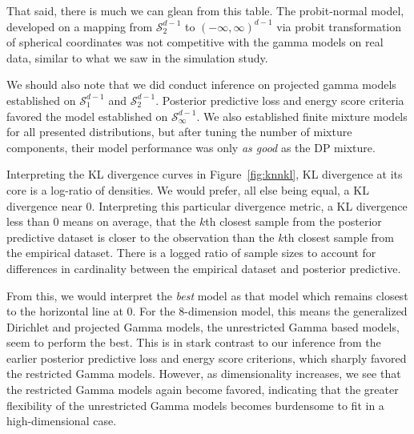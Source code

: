 That said, there is much we can glean from this table.  The probit-normal model, developed on a mapping
  from $\mathcal{S}_{2}^{d-1}$ to $(-\infty,\infty)^{d-1}$ via probit transformation of spherical coordinates
  was not competitive with the gamma models on real data, similar to what we saw in the simulation study.

We should also note that we did conduct inference on projected gamma models established on
  $\mathcal{S}_{1}^{d-1}$ and $\mathcal{S}_2^{d-1}$.  Posterior predictive loss and energy score criteria
  favored the model established on $\mathcal{S}_{\infty}^{d-1}$.  We also established finite mixture
  models for all presented distributions, but after tuning the number of mixture components, their
  model performance was only \emph{as good} as the DP mixture.


Interpreting the KL divergence curves in Figure~\ref{fig:knnkl}, KL divergence at its core is a
  log-ratio of densities.  We would prefer, all else being equal, a KL divergence near 0.
  Interpreting this particular divergence metric, a KL divergence less than 0 means on average,
  that the $k$th closest sample from the posterior predictive dataset is closer to the observation
  than the $k$th closest sample from the empirical dataset.  There is a logged ratio of sample sizes
  to account for differences in cardinality between the empirical dataset and posterior predictive.

From this, we would interpret the \emph{best} model as that model which remains closest to the
  horizontal line at $0$.  For the 8-dimension model, this means the generalized Dirichlet and
  projected Gamma models, the unrestricted Gamma based models, seem to perform the best.   This is
  in stark contrast to our inference from the earlier posterior predictive loss and energy score
  criterions, which sharply favored the restricted Gamma models.  However, as dimensionality
  increases, we see that the restricted Gamma models again become favored, indicating that the
  greater flexibility of the unrestricted Gamma models becomes burdensome to fit in a
  high-dimensional case.




